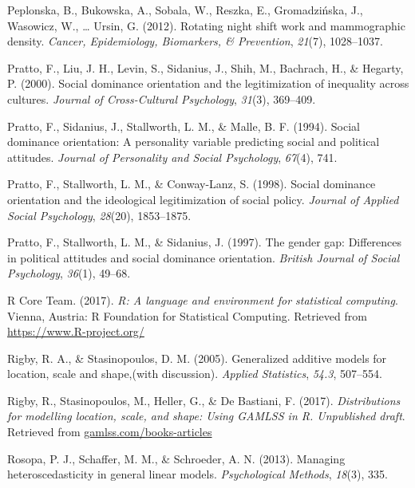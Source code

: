 \documentclass[english,man]{apa6}
\theoremstyle{definition}
\theoremstyle{definition}
\theoremstyle{remark}
\begin{document}
\hypertarget{ref-peplonska2012rotating}{}
Peplonska, B., Bukowska, A., Sobala, W., Reszka, E., Gromadzińska, J.,
Wasowicz, W., \ldots{} Ursin, G. (2012). Rotating night shift work and
mammographic density. \emph{Cancer, Epidemiology, Biomarkers, \&
Prevention}, \emph{21}(7), 1028--1037.

\hypertarget{ref-pratto2000social}{}
Pratto, F., Liu, J. H., Levin, S., Sidanius, J., Shih, M., Bachrach, H.,
\& Hegarty, P. (2000). Social dominance orientation and the
legitimization of inequality across cultures. \emph{Journal of
Cross-Cultural Psychology}, \emph{31}(3), 369--409.

\hypertarget{ref-pratto1994social}{}
Pratto, F., Sidanius, J., Stallworth, L. M., \& Malle, B. F. (1994).
Social dominance orientation: A personality variable predicting social
and political attitudes. \emph{Journal of Personality and Social
Psychology}, \emph{67}(4), 741.

\hypertarget{ref-pratto1998social}{}
Pratto, F., Stallworth, L. M., \& Conway-Lanz, S. (1998). Social
dominance orientation and the ideological legitimization of social
policy. \emph{Journal of Applied Social Psychology}, \emph{28}(20),
1853--1875.

\hypertarget{ref-pratto1997gender}{}
Pratto, F., Stallworth, L. M., \& Sidanius, J. (1997). The gender gap:
Differences in political attitudes and social dominance orientation.
\emph{British Journal of Social Psychology}, \emph{36}(1), 49--68.

\hypertarget{ref-rcore2017}{}
R Core Team. (2017). \emph{R: A language and environment for statistical
computing}. Vienna, Austria: R Foundation for Statistical Computing.
Retrieved from \url{https://www.R-project.org/}

\hypertarget{ref-rigby2005generalized}{}
Rigby, R. A., \& Stasinopoulos, D. M. (2005). Generalized additive
models for location, scale and shape,(with discussion). \emph{Applied
Statistics}, \emph{54.3}, 507--554.

\hypertarget{ref-rigby2017distributions}{}
Rigby, R., Stasinopoulos, M., Heller, G., \& De Bastiani, F. (2017).
\emph{Distributions for modelling location, scale, and shape: Using
GAMLSS in R. Unpublished draft}. Retrieved from
\url{gamlss.com/books-articles}

\hypertarget{ref-rosopa2013managing}{}
Rosopa, P. J., Schaffer, M. M., \& Schroeder, A. N. (2013). Managing
heteroscedasticity in general linear models. \emph{Psychological
Methods}, \emph{18}(3), 335.
\end{document}
